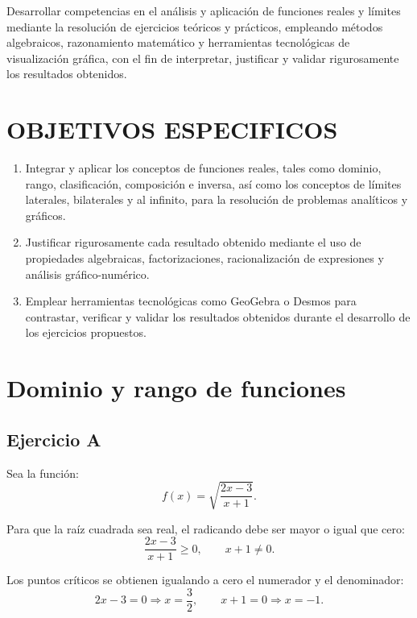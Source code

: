 \documentclass[12pt,a4paper]{article}
\begin{document}
	Desarrollar competencias en el análisis y aplicación de funciones reales y límites mediante la resolución de ejercicios teóricos y prácticos, empleando métodos algebraicos, razonamiento matemático y herramientas tecnológicas de visualización gráfica, con el fin de interpretar, justificar y validar rigurosamente los resultados obtenidos.
	
	\section{OBJETIVOS ESPECIFICOS}
	
	\begin{enumerate}
		
		\item Integrar y aplicar los conceptos de funciones reales, tales como dominio, rango, clasificación, composición e inversa, así como los conceptos de límites laterales, bilaterales y al infinito, para la resolución de problemas analíticos y gráficos.
		
		\item Justificar rigurosamente cada resultado obtenido mediante el uso de propiedades algebraicas, factorizaciones, racionalización de expresiones y análisis gráfico-numérico.
		
		\item Emplear herramientas tecnológicas como GeoGebra o Desmos para contrastar, verificar y validar los resultados obtenidos durante el desarrollo de los ejercicios propuestos.
		
	\end{enumerate}
	
	\section{Dominio y rango de funciones}
	
	\subsection{Ejercicio A}
	
	Sea la función:
	\[
	f(x)=\sqrt{\frac{2x-3}{x+1}}.
	\]
	
	Para que la raíz cuadrada sea real, el radicando debe ser mayor o igual que cero:
	\[
	\frac{2x-3}{x+1}\geq 0,
	\qquad x+1\neq 0.
	\]
	
	Los puntos críticos se obtienen igualando a cero el numerador y el denominador:
	\[
	2x-3=0 \Rightarrow x=\frac{3}{2},
	\qquad
	x+1=0 \Rightarrow x=-1.
	\]
	
\end{document}
